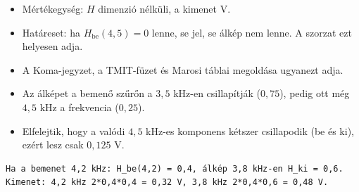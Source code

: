 \begin{center}\end{center}
\begin{eredmeny}

\begin{center}\end{center}

\begin{center}\end{center}
\end{eredmeny}
\begin{tipp}[Ellenőrzés]
\begin{itemize}
\item Mértékegység: $H$ dimenzió nélküli, a kimenet V.
\item Határeset: ha $H_\text{be}(4{,}5)=0$ lenne, se jel, se álkép nem lenne. A szorzat ezt helyesen adja.
\item A Koma-jegyzet, a TMIT-füzet és Marosi táblai megoldása ugyanezt adja.
\end{itemize}
\end{tipp}
\begin{figyelem}
\begin{itemize}
\item Az álképet a bemenő szűrőn a $3{,}5$ kHz-en csillapítják ($0{,}75$), pedig ott még $4{,}5$ kHz a frekvencia ($0{,}25$).
\item Elfelejtik, hogy a valódi $4{,}5$ kHz-es komponens kétszer csillapodik (be és ki), ezért lesz csak $0{,}125$ V.
\end{itemize}
\end{figyelem}
\begin{tipp}
\small
\begin{verbatim}
Ha a bemenet 4,2 kHz: H_be(4,2) = 0,4, álkép 3,8 kHz-en H_ki = 0,6.
Kimenet: 4,2 kHz 2*0,4*0,4 = 0,32 V, 3,8 kHz 2*0,4*0,6 = 0,48 V.
\end{verbatim}
\end{tipp}
\begin{tipp}

\par{}\par
\end{tipp}



